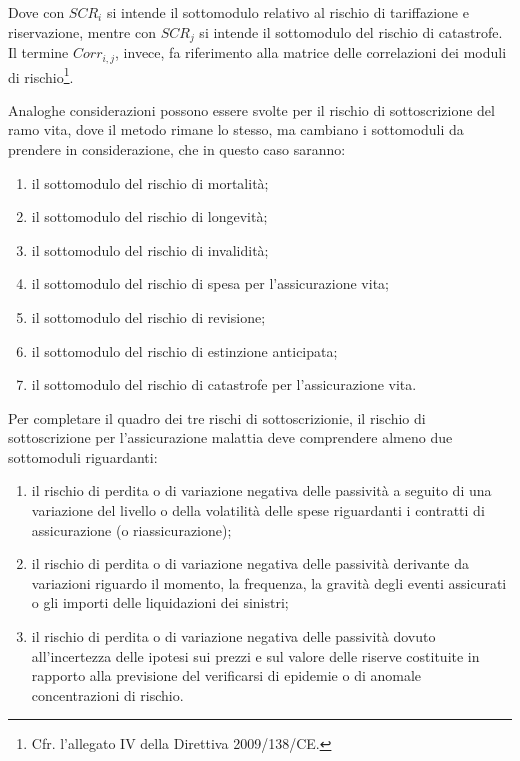 Dove con $ SCR_i $ si intende il sottomodulo relativo al rischio di tariffazione e riservazione, mentre con $ SCR_j $ si intende il sottomodulo del rischio di catastrofe. Il termine $ Corr_{i,j} $, invece, fa riferimento alla matrice delle correlazioni dei moduli di rischio\footnote{Cfr. l’allegato IV della Direttiva 2009/138/CE.}.

Analoghe considerazioni possono essere svolte per il rischio di sottoscrizione del ramo vita, dove il metodo rimane lo stesso, ma cambiano i sottomoduli da prendere in considerazione, che in questo caso saranno:
\begin{enumerate}
\item	 il sottomodulo del rischio di mortalità;
\item	 il sottomodulo del rischio di longevità;
\item	 il sottomodulo del rischio di invalidità;
\item	 il sottomodulo del rischio di spesa per l’assicurazione vita;
\item	 il sottomodulo del rischio di revisione;
\item	 il sottomodulo del rischio di estinzione anticipata;
\item	 il sottomodulo del rischio di catastrofe per l’assicurazione vita.
\end{enumerate}

Per completare il quadro dei tre rischi di sottoscrizionie, il rischio di sottoscrizione per l’assicurazione malattia deve comprendere almeno due sottomoduli riguardanti:
\begin{enumerate}
\item	 il rischio di perdita o di variazione negativa delle passività a seguito di una variazione del livello o della volatilità delle spese riguardanti i contratti di assicurazione (o riassicurazione);
\item	 il rischio di perdita o di variazione negativa delle passività derivante da variazioni riguardo il momento, la frequenza, la gravità degli eventi assicurati o gli importi delle liquidazioni dei sinistri;
\item	 il rischio di perdita o di variazione negativa delle passività dovuto all’incertezza delle ipotesi sui prezzi e sul valore delle riserve costituite in rapporto alla previsione del verificarsi di epidemie o di anomale concentrazioni di rischio.
\end{enumerate}

